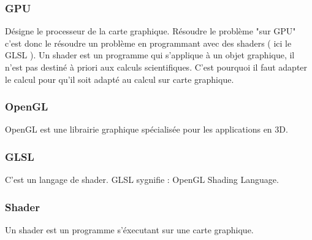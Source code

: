 \documentclass[a4paper,10pt]{article}
\begin{document}
\subsubsection{GPU}
Désigne le processeur de la carte graphique. Résoudre le problème "sur GPU" c'est donc le résoudre 
un problème en programmant avec des shaders ( ici le GLSL ). Un shader est un programme qui s'applique à 
un objet graphique, il n'est pas destiné à priori aux calculs scientifiques. C'est pourquoi
il faut adapter le calcul pour qu'il soit adapté au calcul sur carte graphique.
\subsubsection{OpenGL}
OpenGL est une librairie graphique spécialisée pour les applications en 3D.
\subsubsection{GLSL}
C'est un langage de shader. GLSL sygnifie : OpenGL Shading Language.
\subsubsection{Shader}
Un shader est un programme s'éxecutant sur une carte graphique.

\end{document}
